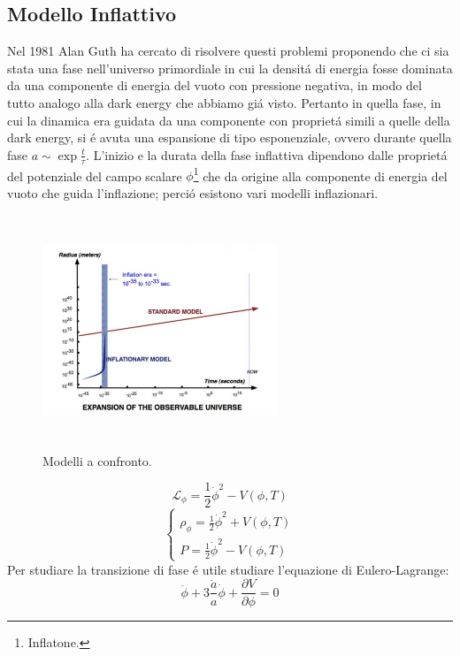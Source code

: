 \documentclass[12pt, a4paper]{article}
\begin{document}
\subsection{Modello Inflattivo}
Nel 1981 Alan Guth ha cercato di risolvere questi problemi proponendo che ci sia stata una fase nell’universo primordiale in cui la densit\'{a} di energia fosse dominata da una componente di energia del vuoto con pressione negativa, in modo del tutto analogo alla dark energy che abbiamo gi\'{a} visto. Pertanto in quella fase, in cui la dinamica era guidata da una componente con propriet\'{a} simili a quelle della dark energy, si \'{e} avuta una espansione di tipo esponenziale, ovvero durante quella fase $a\sim \exp{\frac{t}{\tau}}$. L’inizio e la durata della fase inflattiva dipendono dalle propriet\'{a} del potenziale del campo scalare $\phi$\footnote{Inflatone.} che da origine alla componente di energia del vuoto che guida l’inflazione; perci\'{o} esistono vari modelli inflazionari.
\begin{figure}[htp]
    \centering
    \includegraphics[width=7cm, height=7cm]{images/inflation.png}
    \caption{Modelli a confronto.}
    \label{fig:inflazione}
\end{figure}
\begin{equation}
\mathcal{L}_{\phi}=\frac{1}{2}\dot{\phi}^2-V(\phi,T)
\end{equation}
\begin{equation}
\begin{cases}
\rho_{\phi}=\frac{1}{2}\dot{\phi}^2+V(\phi,T)
\\
P=\frac{1}{2}\dot{\phi}^2-V(\phi,T)
\end{cases}
\end{equation}
Per studiare la transizione di fase \'{e} utile studiare l'equazione di Eulero-Lagrange:
\begin{equation}
\ddot{\phi}+3\frac{\dot{a}}{a}\dot{\phi}+\frac{\partial V}{\partial \phi}=0
\end{equation}
\end{document}
